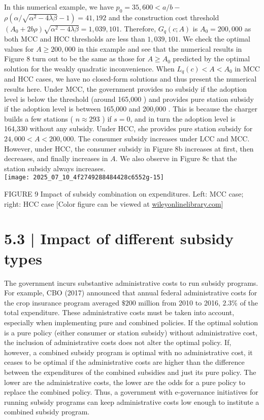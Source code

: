 \documentclass[10pt]{article}
\begin{document}
In this numerical example, we have $p_{0}=35,600<a / b-$ $\rho\left(\alpha / \sqrt{\alpha^{2}-4 \lambda \beta}-1\right)=41,192$ and the construction cost threshold $\left(A_{0}+2 b \rho\right) \sqrt{\alpha^{2}-4 \lambda \beta}=1,039,101$. Therefore, $G_{q}(c ; A)$ is $A_{0}=200,000$ as both MCC and HCC thresholds are less than $1,039,101$. We check the optimal values for $A \geq 200,000$ in this example and see that the numerical results in Figure 8 turn out to be the same as those for $A \geq A_{0}$ predicted by the optimal solution for the weakly quadratic inconvenience. When $L_{q}(c)<A<A_{0}$ in MCC and HCC cases, we have no closed-form solutions and thus present the numerical results here. Under MCC, the government provides no subsidy if the adoption level is below the threshold (around 165,000 ) and provides pure station subsidy if the adoption level is between 165,000 and 200,000 . This is because the charger builds a few stations ( $n \approx 293$ ) if $s=0$, and in turn the adoption level is 164,330 without any subsidy. Under HCC, she provides pure station subsidy for $24,000<A<200,000$. The consumer subsidy increases under LCC and MCC. However, under HCC, the consumer subsidy in Figure 8b increases at first, then decreases, and finally increases in $A$. We also observe in Figure 8c that the station subsidy always increases.\\
\texttt{[image: 2025\_07\_10\_4f2749288484428c6552g-15]}

FIGURE 9 Impact of subsidy combination on expenditures. Left: MCC case; right: HCC case [Color figure can be viewed at \href{http://wileyonlinelibrary.com}{wileyonlinelibrary.com}]

\section*{5.3 | Impact of different subsidy types}
The government incurs substantive administrative costs to run subsidy programs. For example, CBO (2017) announced that annual federal administrative costs for the crop insurance program averaged $\$ 200$ million from 2010 to 2016, $2.3 \%$ of the total expenditure. These administrative costs must be taken into account, especially when implementing pure and combined policies. If the optimal solution is a pure policy (either consumer or station subsidy) without administrative cost, the inclusion of administrative costs does not alter the optimal policy. If, however, a combined subsidy program is optimal with no administrative cost, it ceases to be optimal if the administrative costs are higher than the difference between the expenditures of the combined subsidies and just its pure policy. The lower are the administrative costs, the lower are the odds for a pure policy to replace the combined policy. Thus, a government with e-governance initiatives for running subsidy programs can keep administrative costs low enough to institute a combined subsidy program.
\end{document}
